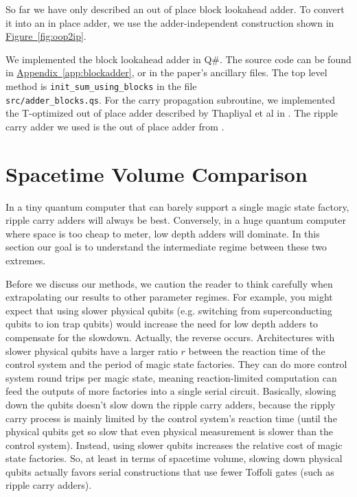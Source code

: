 \documentclass[onecolumn,unpublished]{quantumarticle}
\theoremstyle{definition}
\theoremstyle{definition}
\theoremstyle{definition}
\DeclareRobustCommand{\app}[1]{\hyperref[app:#1]{Appendix~\ref*{app:#1}}}
\newcommand{\fig}[1]{\hyperref[fig:#1]{Figure~\ref*{fig:#1}}}
\begin{document}
So far we have only described an out of place block lookahead adder.
To convert it into an in place adder, we use the adder-independent construction shown in \fig{oop2ip}.

We implemented the block lookahead adder in Q\#.
The source code can be found in \app{blockadder}, or in the paper's ancillary files.
The top level method is \texttt{init\_sum\_using\_blocks} in the file \\\texttt{src/adder\_blocks.qs}.
For the carry propagation subroutine, we implemented the T-optimized out of place adder described by Thapliyal et al in \cite{thapliyal2020lookahead}.
The ripple carry adder we used is the out of place adder from \cite{gidney2018halving}.


\section{Spacetime Volume Comparison}
\label{sec:estimate}

In a tiny quantum computer that can barely support a single magic state factory, ripple carry adders will always be best.
Conversely, in a huge quantum computer where space is too cheap to meter, low depth adders will dominate.
In this section our goal is to understand the intermediate regime between these two extremes.

Before we discuss our methods, we caution the reader to think carefully when extrapolating our results to other parameter regimes.
For example, you might expect that using slower physical qubits (e.g. switching from superconducting qubits to ion trap qubits) would increase the need for low depth adders to compensate for the slowdown.
Actually, the reverse occurs.
Architectures with slower physical qubits have a larger ratio $r$ between the reaction time of the control system and the period of magic state factories.
They can do more control system round trips per magic state, meaning reaction-limited computation can feed the outputs of more factories into a single serial circuit.
Basically, slowing down the qubits doesn't slow down the ripple carry adders, because the ripply carry process is mainly limited by the control system's reaction time (until the physical qubits get so slow that even physical measurement is slower than the control system).
Instead, using slower qubits increases the relative cost of magic state factories.
So, at least in terms of spacetime volume, slowing down physical qubits actually favors serial constructions that use fewer Toffoli gates (such as ripple carry adders).
\end{document}
